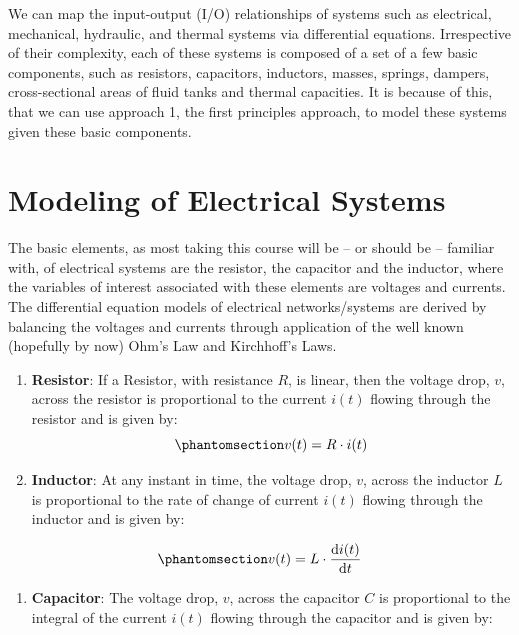 \documentclass[
  14pt,
  a4paper,
  oneside,
  open=any,
  a4paper,
  14pt]{report}
\providecommand{\tightlist}{%
  \setlength{\itemsep}{0pt}\setlength{\parskip}{0pt}}\usepackage{longtable,booktabs,array}
\begin{document}
We can map the input-output (I/O) relationships of systems such as
electrical, mechanical, hydraulic, and thermal systems via differential
equations. Irrespective of their complexity, each of these systems is
composed of a set of a few basic components, such as resistors,
capacitors, inductors, masses, springs, dampers, cross-sectional areas
of fluid tanks and thermal capacities. It is because of this, that we
can use approach 1, the first principles approach, to model these
systems given these basic components.

\section{Modeling of Electrical
Systems}\label{modeling-of-electrical-systems}

The basic elements, as most taking this course will be -- or should be
-- familiar with, of electrical systems are the resistor, the capacitor
and the inductor, where the variables of interest associated with these
elements are voltages and currents. The differential equation models of
electrical networks/systems are derived by balancing the voltages and
currents through application of the well known (hopefully by now) Ohm's
Law and Kirchhoff's Laws.

\begin{enumerate}
\def\labelenumi{\arabic{enumi}.}
\item
  \textbf{Resistor}: If a Resistor, with resistance \(R\), is linear,
  then the voltage drop, \(v\), across the resistor is proportional to
  the current \(i(t)\) flowing through the resistor and is given by:
  \begin{equation}\phantomsection\label{eq-elecsys-resistor}{
   v(t) = R \cdot i(t)
  }\end{equation}
\item
  \textbf{Inductor}: At any instant in time, the voltage drop, \(v\),
  across the inductor \(L\) is proportional to the rate of change of
  current \(i(t)\) flowing through the inductor and is given by:
\end{enumerate}

\begin{equation}\phantomsection\label{eq-elecsys-inductor}{
    v(t) = L \cdot \odv{i(t)}{t}
}\end{equation}

\begin{enumerate}
\def\labelenumi{\arabic{enumi}.}
\setcounter{enumi}{2}
\tightlist
\item
  \textbf{Capacitor}: The voltage drop, \(v\), across the capacitor
  \(C\) is proportional to the integral of the current \(i(t)\) flowing
  through the capacitor and is given by:
\end{enumerate}
\end{document}
